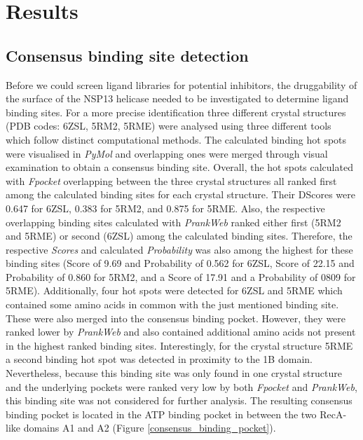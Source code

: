 \documentclass[11pt, letterpaper, titlepage]{article}
\begin{document}
\section{Results} 
\subsection{Consensus binding site detection}
Before we could screen ligand libraries for potential inhibitors, the druggability of the surface of the NSP13 helicase needed to be investigated to determine ligand binding sites. For a more precise identification three different crystal structures (PDB codes: 6ZSL, 5RM2, 5RME) were analysed using three different tools which follow distinct computational methods. The calculated binding hot spots were visualised in \textit{PyMol} and overlapping ones were merged through visual examination to obtain a consensus binding site.
Overall, the hot spots calculated with \textit{Fpocket} overlapping between the three crystal structures all ranked first among the calculated binding sites for each crystal structure. Their \acp{DScore} were 0.647 for 6ZSL, 0.383 for 5RM2, and 0.875 for 5RME. Also, the respective overlapping binding sites calculated with \textit{PrankWeb} ranked either first (5RM2 and 5RME) or second (6ZSL) among the calculated binding sites. Therefore, the respective \textit{Scores} and calculated \textit{Probability} was also among the highest for these binding sites (Score of 9.69 and Probability of 0.562 for 6ZSL, Score of 22.15 and Probability of 0.860 for 5RM2, and a Score of 17.91 and a Probability of 0809 for 5RME). Additionally, four hot spots were detected for 6ZSL and 5RME which contained some amino acids in common with the just mentioned binding site. These were also merged into the consensus binding pocket. However, they were ranked lower by \textit{PrankWeb} and also contained additional amino acids not present in the highest ranked binding sites. 
Interestingly, for the crystal structure 5RME a second binding hot spot was detected in proximity to the 1B domain. Nevertheless, because this binding site was only found in one crystal structure and the underlying pockets were ranked very low by both \textit{Fpocket} and \textit{PrankWeb}, this binding site was not considered for further analysis.
The resulting consensus binding pocket is located in the ATP binding pocket in between the two RecA-like domains A1 and A2 (Figure \ref{consensus_binding_pocket}). 
\end{document}

